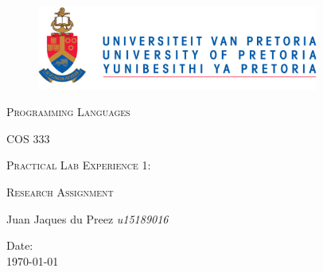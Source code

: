 \begin{titlepage}
	\begin{center}
		\begin{figure}[t]
			\centering
			\includegraphics[width=350px]{logo.PNG}
		\end{figure}
		
		\begin{center}
			\textsc{\Huge Programming Languages}
		\end{center}
		\begin{center}
			\textsc{\Huge COS 333}
		\end{center}
		\begin{center}		
			\textsc{\LARGE Practical Lab Experience 1:}		
		\end{center}
		\begin{center}		
			\textsc{\LARGE Research Assignment}		
		\end{center}
		
		\begin{flushright} \large
			Juan Jaques du Preez \newline \emph{u15189016} \newline
		\end{flushright}
\par\vspace{\fill}
{\large Date:}
\\
{\large \today}

	\end{center}
\end{titlepage}
